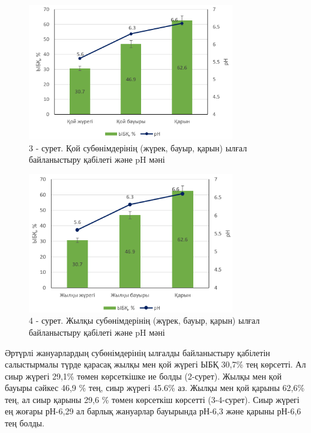\begin{figure}[H]
	\centering
	\includegraphics[width=0.8\textwidth]{media/pish/image6}
	\caption*{3 - сурет. Қой субөнімдерінің (жүрек, бауыр, қарын) ылғал байланыстыру қабілеті және pH мәні}
\end{figure}

\begin{figure}[H]
	\centering
	\includegraphics[width=0.8\textwidth]{media/pish/image7}
	\caption*{4 - сурет. Жылқы субөнімдерінің (жүрек, бауыр, қарын) ылғал байланыстыру қабілеті және pH мәні}
\end{figure}

Әртүрлі жануарлардың субөнімдерінің ылғалды байланыстыру қабілетін
салыстырмалы түрде қарасақ жылқы мен қой жүрегі ЫБҚ 30,7\% тең көрсетті.
Ал сиыр жүрегі 29,1\% төмен көрсеткішке ие болды (2-сурет). Жылқы мен
қой бауыры сәйкес 46,9 \% тең, сиыр жүрегі 45.6\% аз. Жылқы мен қой
қарыны 62,6\% тең, ал сиыр қарыны 29,6 \% төмен көрсеткіш көрсетті
(3-4-сурет). Сиыр жүрегі ең жоғары рН-6,29 ал барлық жануарлар бауырында
рН-6,3 және қарыны рН-6,6 тең болды.


